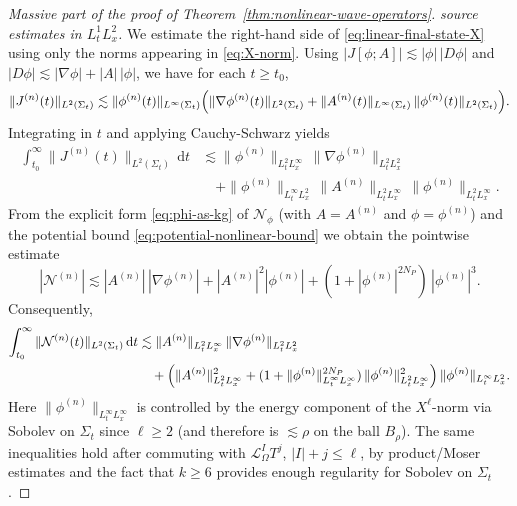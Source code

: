 \documentclass[11pt]{article}
\numberwithin{equation}{section}
\theoremstyle{plain}
\theoremstyle{definition}
\theoremstyle{remark}
\newcommand{\dd}{\mathrm{d}}
\begin{document}
\begin{proof}[Massive part of the proof of Theorem~\ref{thm:nonlinear-wave-operators}]
\medskip
\noindent\textit{source estimates in $L^{1}_{t}L^{2}_{x}$.}
We estimate the right-hand side of \eqref{eq:linear-final-state-X} using only the norms appearing in \eqref{eq:X-norm}.
Using $|J[\phi;A]|\lesssim |\phi|\,|D\phi|$ and $|D\phi|\lesssim|\nabla\phi|+|A|\,|\phi|$, we have for each $t\ge t_0$,
\begin{equation}\label{eq:J-est-pointwise}
\|J^{(n)}(t)\|_{L^{2}(\Sigma_t)}
\lesssim
\|\phi^{(n)}(t)\|_{L^{\infty}(\Sigma_t)}
\Bigl(
\|\nabla\phi^{(n)}(t)\|_{L^{2}(\Sigma_t)}
+
\|A^{(n)}(t)\|_{L^{\infty}(\Sigma_t)}\,\|\phi^{(n)}(t)\|_{L^{2}(\Sigma_t)}
\Bigr).
\end{equation}
Integrating in $t$ and applying Cauchy-Schwarz yields
\begin{eqnarray}\label{eq:J-est-L1}
\int_{t_0}^{\infty}\|J^{(n)}(t)\|_{L^{2}(\Sigma_t)}\,\dd t
&\lesssim
\|\phi^{(n)}\|_{L^{2}_{t}L^{\infty}_{x}}\,
\|\nabla\phi^{(n)}\|_{L^{2}_{t}L^{2}_{x}}
\\
&\quad
+
\|\phi^{(n)}\|_{L^{\infty}_{t}L^{2}_{x}}\,
\|A^{(n)}\|_{L^{2}_{t}L^{\infty}_{x}}\,
\|\phi^{(n)}\|_{L^{2}_{t}L^{\infty}_{x}}.
\nonumber
\end{eqnarray}
From the explicit form \eqref{eq:phi-as-kg} of $\mathcal N_\phi$ (with $A=A^{(n)}$ and $\phi=\phi^{(n)}$) and the potential bound \eqref{eq:potential-nonlinear-bound} we obtain the pointwise estimate
\begin{equation}
|\mathcal N^{(n)}|
\lesssim
|A^{(n)}|\,|\nabla\phi^{(n)}|
+
|A^{(n)}|^{2}|\phi^{(n)}|
+
(1+|\phi^{(n)}|^{2N_{P}})\,|\phi^{(n)}|^{3}.
\end{equation}
Consequently,
\begin{eqnarray}\label{eq:N-est-L1}
\int_{t_0}^{\infty}\|\mathcal N^{(n)}(t)\|_{L^{2}(\Sigma_t)}\,\dd t
&\lesssim
\|A^{(n)}\|_{L^{2}_{t}L^{\infty}_{x}}\,
\|\nabla\phi^{(n)}\|_{L^{2}_{t}L^{2}_{x}}
\\
&\quad
+
\Bigl(\|A^{(n)}\|_{L^{2}_{t}L^{\infty}_{x}}^{2}
+(1+\|\phi^{(n)}\|_{L^{\infty}_{t}L^{\infty}_{x}}^{2N_{P}})\,\|\phi^{(n)}\|_{L^{2}_{t}L^{\infty}_{x}}^{2}\Bigr)\,
\|\phi^{(n)}\|_{L^{\infty}_{t}L^{2}_{x}}.
\nonumber
\end{eqnarray}
Here $\|\phi^{(n)}\|_{L^{\infty}_{t}L^{\infty}_{x}}$ is controlled by the energy component of the $X^{\ell}$-norm via Sobolev on $\Sigma_t$ since $\ell\ge 2$ (and therefore is $\lesssim\rho$ on the ball $B_\rho$). The same inequalities hold after commuting with $\mathcal L_{\Omega}^{I}T^{j}$, $|I|+j\le\ell$, by product/Moser estimates and the fact that $k\ge 6$ provides enough regularity for Sobolev on $\Sigma_t$.


\end{proof}
\end{document}
